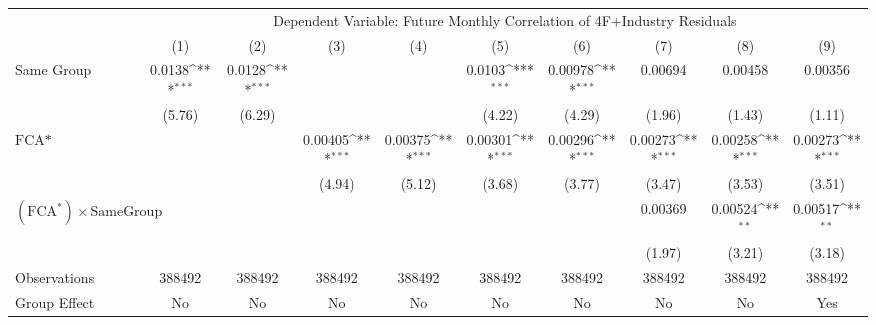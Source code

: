 {
\def\sym#1{\ifmmode^{#1}\else\(^{#1}\)\fi}
\begin{tabular}{l*{9}{c}}
\hline\hline
                &\multicolumn{9}{c}{Dependent Variable: Future Monthly Correlation of 4F+Industry Residuals}                                                                               \\\cmidrule(lr){2-10}
                &\multicolumn{1}{c}{(1)}         &\multicolumn{1}{c}{(2)}         &\multicolumn{1}{c}{(3)}         &\multicolumn{1}{c}{(4)}         &\multicolumn{1}{c}{(5)}         &\multicolumn{1}{c}{(6)}         &\multicolumn{1}{c}{(7)}         &\multicolumn{1}{c}{(8)}         &\multicolumn{1}{c}{(9)}         \\
\hline
Same Group      &   0.0138\sym{***}&   0.0128\sym{***}&                  &                  &   0.0103\sym{***}&  0.00978\sym{***}&  0.00694         &  0.00458         &  0.00356         \\
                &   (5.76)         &   (6.29)         &                  &                  &   (4.22)         &   (4.29)         &   (1.96)         &   (1.43)         &   (1.11)         \\
[1em]
$ \text{FCA*} $ &                  &                  &  0.00405\sym{***}&  0.00375\sym{***}&  0.00301\sym{***}&  0.00296\sym{***}&  0.00273\sym{***}&  0.00258\sym{***}&  0.00273\sym{***}\\
                &                  &                  &   (4.94)         &   (5.12)         &   (3.68)         &   (3.77)         &   (3.47)         &   (3.53)         &   (3.51)         \\
[1em]
 $ (\text{FCA}^*) \times {\text{SameGroup} }  $ &                  &                  &                  &                  &                  &                  &  0.00369         &  0.00524\sym{**} &  0.00517\sym{**} \\
                &                  &                  &                  &                  &                  &                  &   (1.97)         &   (3.21)         &   (3.18)         \\
\hline
Observations    &   388492         &   388492         &   388492         &   388492         &   388492         &   388492         &   388492         &   388492         &   388492         \\
Group Effect    &       No         &       No         &       No         &       No         &       No         &       No         &       No         &       No         &      Yes         \\

\end{tabular}}
